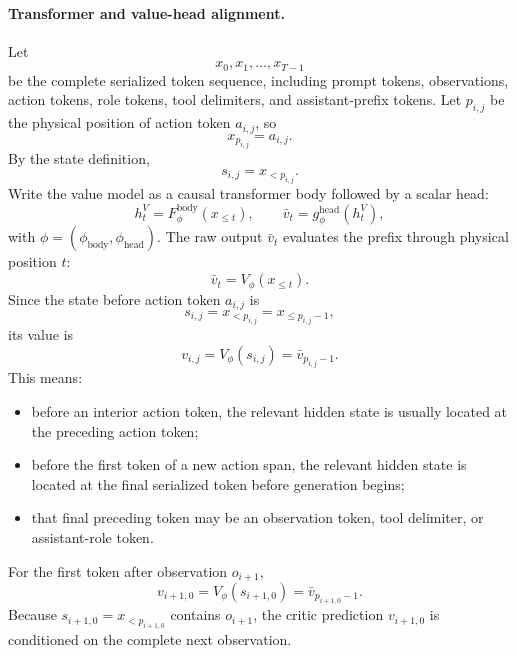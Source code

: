\paragraph{Transformer and value-head alignment.}
Let
\[
    x_0,x_1,\ldots,x_{T-1}
\]
be the complete serialized token sequence, including prompt tokens, observations, action tokens, role tokens, tool delimiters, and assistant-prefix tokens. Let $p_{i,j}$ be the physical position of action token $a_{i,j}$, so
\[
    x_{p_{i,j}}=a_{i,j}.
\]
By the state definition,
\[
    s_{i,j}=x_{<p_{i,j}}.
\]
Write the value model as a causal transformer body followed by a scalar head:
\[
    h^V_t=F^{\mathrm{body}}_\phi(x_{\le t}),
    \qquad
    \bar v_t=g^{\mathrm{head}}_\phi(h^V_t),
\]
with $\phi=(\phi_{\mathrm{body}},\phi_{\mathrm{head}})$. The raw output $\bar v_t$ evaluates the prefix through physical position $t$:
\[
    \bar v_t=V_\phi(x_{\le t}).
\]
Since the state before action token $a_{i,j}$ is
\[
    s_{i,j}=x_{<p_{i,j}}=x_{\le p_{i,j}-1},
\]
its value is
\[
    v_{i,j}=V_\phi(s_{i,j})=\bar v_{p_{i,j}-1}.
\]
This means:
\begin{itemize}
    \item before an interior action token, the relevant hidden state is usually located at the preceding action token;
    \item before the first token of a new action span, the relevant hidden state is located at the final serialized token before generation begins;
    \item that final preceding token may be an observation token, tool delimiter, or assistant-role token.
\end{itemize}

For the first token after observation $o_{i+1}$,
\[
    v_{i+1,0}=V_\phi(s_{i+1,0})=\bar v_{p_{i+1,0}-1}.
\]
Because $s_{i+1,0}=x_{<p_{i+1,0}}$ contains $o_{i+1}$, the critic prediction $v_{i+1,0}$ is conditioned on the complete next observation.


